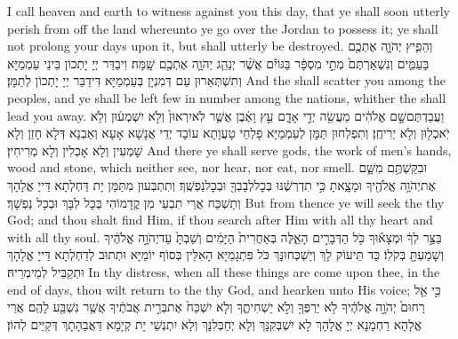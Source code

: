 {I call heaven and earth to witness against you this day, that ye shall soon utterly perish from off the land whereunto ye go over the Jordan to possess it; ye shall not prolong your days upon it, but shall utterly be destroyed.}{}
{וְהֵפִ֧יץ יְהֹוָ֛ה אֶתְכֶ֖ם בָּעַמִּ֑ים וְנִשְׁאַרְתֶּם֙ מְתֵ֣י מִסְפָּ֔ר בַּגּוֹיִ֕ם אֲשֶׁ֨ר יְנַהֵ֧ג יְהֹוָ֛ה אֶתְכֶ֖ם שָֽׁמָּה׃}
{וִיבַדַּר יְיָ יָתְכוֹן בֵּינֵי עַמְמַיָּא וְתִשְׁתְּאַרוּן עַם דְּמִנְיָן בְּעַמְמַיָּא דִּידַבַּר יְיָ יָתְכוֹן לְתַמָּן׃}
{And the \lord\space shall scatter you among the peoples, and ye shall be left few in number among the nations, whither the \lord\space shall lead you away.}{}
{וַעֲבַדְתֶּם\maqqaf שָׁ֣ם אֱלֹהִ֔ים מַעֲשֵׂ֖ה יְדֵ֣י אָדָ֑ם עֵ֣ץ וָאֶ֔בֶן אֲשֶׁ֤ר לֹֽא\maqqaf יִרְאוּן֙ וְלֹ֣א יִשְׁמְע֔וּן וְלֹ֥א יֹֽאכְל֖וּן וְלֹ֥א יְרִיחֻֽן׃}
{וְתִפְלְחוּן תַּמָּן לְעַמְמַיָּא פָלְחֵי טָעֲוָתָא עוֹבָד יְדֵי אֲנָשָׁא אָעָא וְאַבְנָא דְּלָא חָזַן וְלָא שָׁמְעִין וְלָא אָכְלִין וְלָא מְרִיחִין׃}
{And there ye shall serve gods, the work of men’s hands, wood and stone, which neither see, nor hear, nor eat, nor smell.}{}
{וּבִקַּשְׁתֶּ֥ם מִשָּׁ֛ם אֶת\maqqaf יְהֹוָ֥ה אֱלֹהֶ֖יךָ וּמָצָ֑אתָ כִּ֣י תִדְרְשֶׁ֔נּוּ בְּכׇל\maqqaf לְבָבְךָ֖ וּבְכׇל\maqqaf נַפְשֶֽׁךָ׃}
{וְתִתְבְּעוּן מִתַּמָּן יָת דַּחְלְתָא דַּייָ אֱלָהָךְ וְתַשְׁכַּח אֲרֵי תִבְעֵי מִן קֳדָמוֹהִי בְּכָל לִבָּךְ וּבְכָל נַפְשָׁךְ׃}
{But from thence ye will seek the \lord\space thy God; and thou shalt find Him, if thou search after Him with all thy heart and with all thy soul.}{}
{בַּצַּ֣ר לְךָ֔ וּמְצָא֕וּךָ כֹּ֖ל הַדְּבָרִ֣ים הָאֵ֑לֶּה בְּאַחֲרִית֙ הַיָּמִ֔ים וְשַׁבְתָּ֙ עַד\maqqaf יְהֹוָ֣ה אֱלֹהֶ֔יךָ וְשָׁמַעְתָּ֖ בְּקֹלֽוֹ׃}
{כַּד תֵּיעוֹק לָךְ וְיַשְׁכְּחוּנָּךְ כֹּל פִּתְגָמַיָּא הָאִלֵּין בְּסוֹף יוֹמַיָּא וּתְתוּב לְדַחְלְתָא דַּייָ אֱלָהָךְ וּתְקַבֵּיל לְמֵימְרֵיהּ׃}
{In thy distress, when all these things are come upon thee, in the end of days, thou wilt return to the \lord\space thy God, and hearken unto His voice;}{}
{כִּ֣י אֵ֤ל רַחוּם֙ יְהֹוָ֣ה אֱלֹהֶ֔יךָ לֹ֥א יַרְפְּךָ֖ וְלֹ֣א יַשְׁחִיתֶ֑ךָ וְלֹ֤א יִשְׁכַּח֙ אֶת\maqqaf בְּרִ֣ית אֲבֹתֶ֔יךָ אֲשֶׁ֥ר נִשְׁבַּ֖ע לָהֶֽם׃}
{אֲרֵי אֱלָהָא רַחְמָנָא יְיָ אֱלָהָךְ לָא יִשְׁבְּקִנָּךְ וְלָא יְחַבְּלִנָּךְ וְלָא יִתְנְשֵׁי יָת קְיָמָא דַּאֲבָהָתָךְ דְּקַיֵּים לְהוֹן׃}
